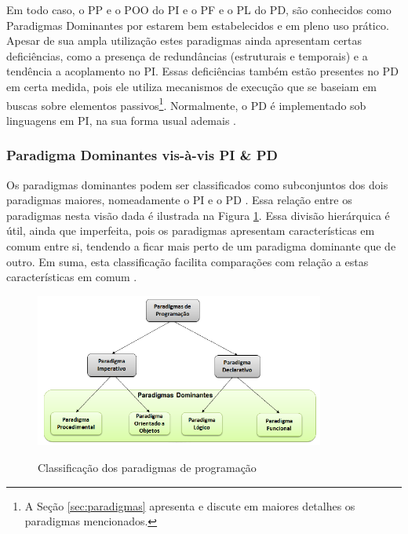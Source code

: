 
Em todo caso, o PP e o POO do PI e o PF e o PL do PD, são conhecidos como
Paradigmas Dominantes por estarem bem estabelecidos e em pleno uso prático.
Apesar de sua ampla utilização estes paradigmas ainda apresentam certas
deficiências, como a presença de redundâncias (estruturais e temporais) e a
tendência a acoplamento no PI. Essas deficiências também estão presentes no PD
em certa medida, pois ele utiliza mecanismos de execução que se baseiam em
buscas sobre elementos passivos\footnote{A Seção \ref{sec:paradigmas} apresenta
e discute em maiores detalhes os paradigmas mencionados.}. Normalmente, o PD é
implementado sob linguagens em PI, na sua forma usual ademais
\cite{msc_Banaszewski_2009,doc_ronszcka_2019}.

\subsubsection{Paradigma Dominantes vis-à-vis PI \& PD}


Os paradigmas dominantes podem ser classificados como subconjuntos dos dois
paradigmas maiores, nomeadamente o PI e o PD \cite{msc_Banaszewski_2009}. Essa
relação entre os paradigmas nesta visão dada é ilustrada na Figura
\ref{fig:classificacao}. Essa divisão hierárquica é útil, ainda que imperfeita,
pois os paradigmas apresentam características em comum entre si, tendendo a
ficar mais perto de um paradigma dominante que de outro. Em suma, esta
classificação facilita comparações com relação a estas características em comum
\cite{doc_ronszcka_2019}.

\begin{figure}[!htb]
  \centering
  \caption{Classificação dos paradigmas de programação}
  \includegraphics[width=0.85\textwidth]{../figures/classificacao_cut2.png}
  \label{fig:classificacao}
\end{figure}

